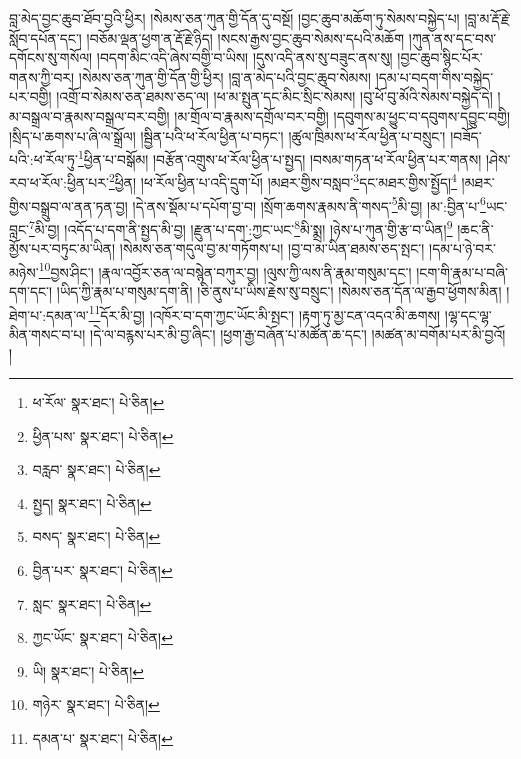 བླ་མེད་བྱང་ཆུབ་ཐོབ་བྱའི་ཕྱིར། །སེམས་ཅན་ཀུན་གྱི་དོན་དུ་བསྔོ། །བྱང་ཆུབ་མཆོག་ཏུ་སེམས་བསྐྱེད་པ། །བླ་མ་རྡོ་རྗེ་སློབ་དཔོན་དང་། །བཅོམ་ལྡན་ཕྱག་ན་རྡོ་རྗེ་ཉིད། །སངས་རྒྱས་བྱང་ཆུབ་སེམས་དཔའི་མཆོག །ཀུན་ནས་དང་བས་དགོངས་སུ་གསོལ། །བདག་མིང་འདི་ཞེས་བགྱི་བ་ཡིས། །དུས་འདི་ནས་སུ་བཟུང་ནས་སུ། །བྱང་ཆུབ་སྙིང་པོར་གནས་ཀྱི་བར། །སེམས་ཅན་ཀུན་གྱི་དོན་གྱི་ཕྱིར། །བླ་ན་མེད་པའི་བྱང་ཆུབ་སེམས། །དམ་པ་བདག་གིས་བསྐྱེད་པར་བགྱི། །འགྲོ་བ་སེམས་ཅན་ཐམས་ཅད་ལ། །ཕ་མ་སྤུན་དང་མིང་སྲིང་སེམས། །བུ་ཕོ་བུ་མོའི་སེམས་བསྐྱེད་དེ། །མ་བསྒྲལ་བ་རྣམས་བསྒྲལ་བར་བགྱི། །མ་གྲོལ་བ་རྣམས་དགྲོལ་བར་བགྱི། །དབུགས་མ་ཕྱུང་བ་དབུགས་དབྱུང་བགྱི། །སྲིད་པ་ཆགས་པ་ཞི་ལ་སྒྲོལ། །སྦྱིན་པའི་ཕ་རོལ་ཕྱིན་པ་བཏང་། །ཚུལ་ཁྲིམས་ཕ་རོལ་ཕྱིན་པ་བསྲུང་། །བཟོད་པའི་:ཕ་རོལ་ཏུ་\footnote{ཕ་རོལ་  སྣར་ཐང་།  པེ་ཅིན། }ཕྱིན་པ་བསྒོམ། །བརྩོན་འགྲུས་ཕ་རོལ་ཕྱིན་པ་སྤྱད། །བསམ་གཏན་ཕ་རོལ་ཕྱིན་པར་གནས། །ཤེས་རབ་ཕ་རོལ་:ཕྱིན་པར་\footnote{ཕྱིན་པས་  སྣར་ཐང་།  པེ་ཅིན། }ཕྱིན། །ཕ་རོལ་ཕྱིན་པ་འདི་དྲུག་པོ། །མཐར་གྱིས་བསླབ་\footnote{བརླབ་  སྣར་ཐང་།  པེ་ཅིན། }དང་མཐར་གྱིས་སྤྱོད།\footnote{སྤྱད།  སྣར་ཐང་།  པེ་ཅིན། } །མཐར་གྱིས་བསྒྲུབ་ལ་ནན་ཏན་བྱ། །དེ་ནས་སྡོམ་པ་དཔོག་བྱ་བ། །སྲོག་ཆགས་རྣམས་ནི་གསད་\footnote{བསད་  སྣར་ཐང་།  པེ་ཅིན། }མི་བྱ། །མ་:བྱིན་པ་\footnote{བྱིན་པར་  སྣར་ཐང་།  པེ་ཅིན། }ཡང་བླང་\footnote{སླང་  སྣར་ཐང་།  པེ་ཅིན། }མི་བྱ། །འདོད་པ་དག་ནི་སྤྱད་མི་བྱ། །རྫུན་པ་དག་:ཀྱང་ཡང་\footnote{ཀྱང་ཡོང་  སྣར་ཐང་།  པེ་ཅིན། }མི་སྨྲ། །ཉེས་པ་ཀུན་གྱི་རྩ་བ་ཡིན།\footnote{ཡི།  སྣར་ཐང་།  པེ་ཅིན། } །ཆང་ནི་མྱོས་པར་བཏུང་མ་ཡིན། །སེམས་ཅན་གདུལ་བྱ་མ་གཏོགས་པ། །བྱ་བ་མ་ཡིན་ཐམས་ཅད་སྤང་། །དམ་པ་ཉེ་བར་མཉེས་\footnote{གཉེར་  སྣར་ཐང་།  པེ་ཅིན། }བྱས་ཤིང་། །རྣལ་འབྱོར་ཅན་ལ་བསྙེན་བཀུར་བྱ། །ལུས་ཀྱི་ལས་ནི་རྣམ་གསུམ་དང་། །ངག་གི་རྣམ་པ་བཞི་དག་དང་། །ཡིད་ཀྱི་རྣམ་པ་གསུམ་དག་ནི། །ཅི་ནུས་པ་ཡིས་རྗེས་སུ་བསྲུང་། །སེམས་ཅན་དོན་ལ་རྒྱབ་ཕྱོགས་མིན། །ཐེག་པ་:དམན་ལ་\footnote{དམན་པ་  སྣར་ཐང་།  པེ་ཅིན། }དོར་མི་བྱ། །འཁོར་བ་དག་ཀྱང་ཡོང་མི་སྤང་། །རྟག་ཏུ་མྱ་ངན་འདའ་མི་ཆགས། །ལྷ་དང་ལྷ་མིན་གསང་བ་པ། །དེ་ལ་བརྙས་པར་མི་བྱ་ཞིང་། །ཕྱག་རྒྱ་བཞོན་པ་མཚོན་ཆ་དང་། །མཚན་མ་བགོམ་པར་མི་བྱའོ། །
